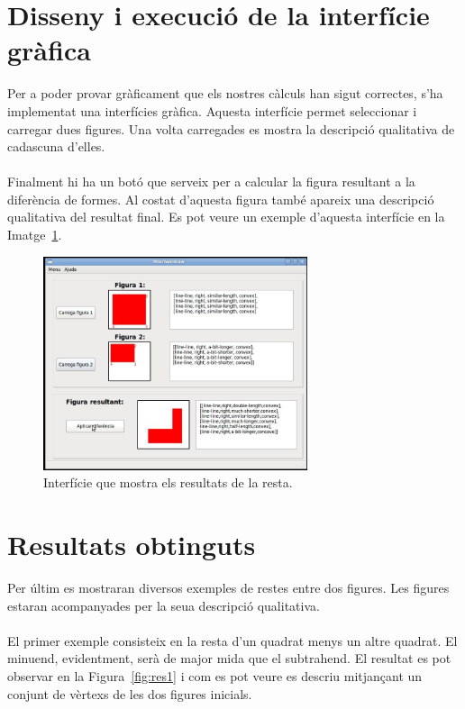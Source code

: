 \documentclass{article}
\begin{document}
\section{Disseny i execució de la interfície gràfica}
Per a poder provar gràficament que els nostres càlculs han sigut correctes, s'ha implementat una interfícies gràfica.
Aquesta interfície permet seleccionar i carregar dues figures.
Una volta carregades es mostra la descripció qualitativa de cadascuna d'elles.
\\
\\
Finalment hi ha un botó que serveix per a calcular la figura resultant a la diferència de formes.
Al costat d'aquesta figura també apareix una descripció qualitativa del resultat final.
Es pot veure un exemple d'aquesta interfície en la Imatge~\ref{fig:iufinal}.

\begin{figure}[h]
\centering
\includegraphics[width=220pt]{images/iufinal_p.png}
\caption {Interfície que mostra els resultats de la resta.}
\label {fig:iufinal}
\end{figure}

\section{Resultats obtinguts}
Per últim es mostraran diversos exemples de restes entre dos figures.
Les figures estaran acompanyades per la seua descripció qualitativa.
\\
\\

El primer exemple consisteix en la resta d'un quadrat menys un altre quadrat.
El minuend, evidentment, serà de major mida que el subtrahend.
El resultat es pot observar en la Figura~\ref{fig:res1} i com es pot veure es descriu mitjançant un conjunt de vèrtexs de les dos figures inicials.
\\
\\
\end{document}
